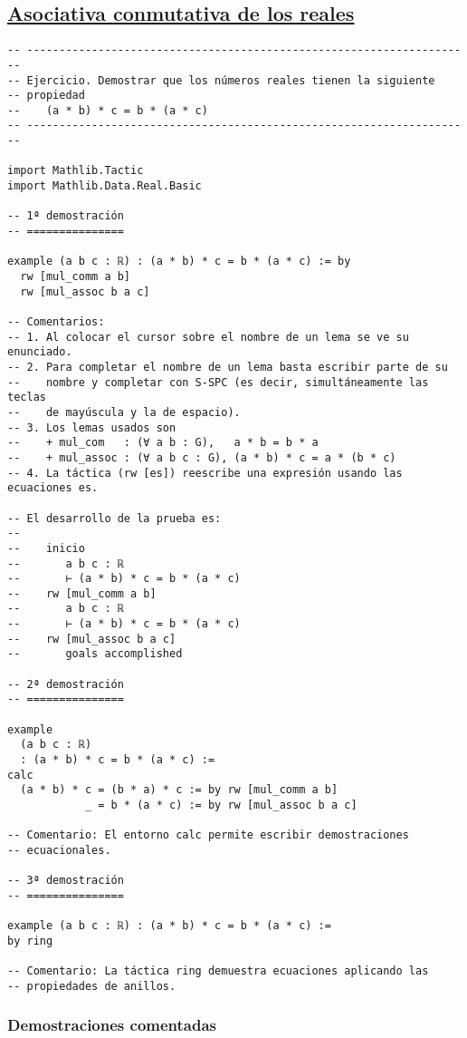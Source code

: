 \subsection{\href{./src/Basicos/Asociativa\_conmutativa\_de\_los\_reales.lean}{Asociativa conmutativa de los reales}}
\label{sec:orgec196f0}
\begin{verbatim}
-- ---------------------------------------------------------------------
-- Ejercicio. Demostrar que los números reales tienen la siguiente
-- propiedad
--    (a * b) * c = b * (a * c)
-- ---------------------------------------------------------------------

import Mathlib.Tactic
import Mathlib.Data.Real.Basic

-- 1ª demostración
-- ===============

example (a b c : ℝ) : (a * b) * c = b * (a * c) := by
  rw [mul_comm a b]
  rw [mul_assoc b a c]

-- Comentarios:
-- 1. Al colocar el cursor sobre el nombre de un lema se ve su enunciado.
-- 2. Para completar el nombre de un lema basta escribir parte de su
--    nombre y completar con S-SPC (es decir, simultáneamente las teclas
--    de mayúscula y la de espacio).
-- 3. Los lemas usados son
--    + mul_com   : (∀ a b : G),   a * b = b * a
--    + mul_assoc : (∀ a b c : G), (a * b) * c = a * (b * c)
-- 4. La táctica (rw [es]) reescribe una expresión usando las ecuaciones es.

-- El desarrollo de la prueba es:
--
--    inicio
--       a b c : ℝ
--       ⊢ (a * b) * c = b * (a * c)
--    rw [mul_comm a b]
--       a b c : ℝ
--       ⊢ (a * b) * c = b * (a * c)
--    rw [mul_assoc b a c]
--       goals accomplished

-- 2ª demostración
-- ===============

example
  (a b c : ℝ)
  : (a * b) * c = b * (a * c) :=
calc
  (a * b) * c = (b * a) * c := by rw [mul_comm a b]
            _ = b * (a * c) := by rw [mul_assoc b a c]

-- Comentario: El entorno calc permite escribir demostraciones
-- ecuacionales.

-- 3ª demostración
-- ===============

example (a b c : ℝ) : (a * b) * c = b * (a * c) :=
by ring

-- Comentario: La táctica ring demuestra ecuaciones aplicando las
-- propiedades de anillos.
\end{verbatim}
\subsubsection*{Demostraciones comentadas}

